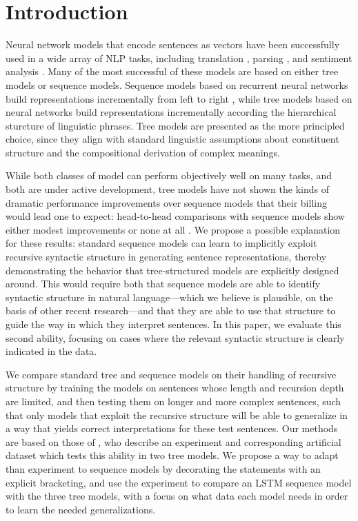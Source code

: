 \section{Introduction}\label{sec:intro}

Neural network models that encode sentences as vectors have been successfully used in a wide array of NLP tasks, including translation \cite{sutskever2014sequence}, parsing \cite{dyer2015transition}, and sentiment analysis \cite{tai2015improved}. Many of the most successful of these models are based on either tree models or sequence models. Sequence models based on recurrent neural networks build representations incrementally from left to right \cite{elman1990finding,sutskever2014sequence}, while tree models based on  neural networks \cite{goller1996learning,socher2011semi} build representations incrementally according the hierarchical sturcture of linguistic phrases. Tree models are presented as the more principled choice, since they align with standard linguistic assumptions about constituent structure and the compositional derivation of complex meanings.

While both classes of model can perform objectively well on many tasks, and both are under active development, tree models have not shown the kinds of dramatic performance improvements over sequence models that their billing would lead one to expect: head-to-head comparisons with sequence models show either modest improvements \cite{tai2015improved} or none at all \cite{li2015tree}. We propose a possible explanation for these results: standard sequence models can learn to implicitly exploit recursive syntactic structure in generating sentence representations, thereby demonstrating the behavior that tree-structured models are explicitly designed around. This would require both that sequence models are able to identify syntactic structure in natural language---which we believe is plausible, on the basis of other recent research---and that they are able to use that structure to guide the way in which they interpret sentences. In this paper, we  evaluate this second ability, focusing on cases where the relevant syntactic structure is clearly indicated in the data.

We compare standard tree and sequence models on their handling of recursive structure by training the models on sentences whose length and recursion depth are limited, and then testing them on longer and more complex sentences, such that only models that exploit the recursive structure will be able to generalize in a way that yields correct interpretations for these test sentences. Our methods are based on those of , who describe an experiment and corresponding artificial dataset which tests this ability in two tree models. We propose a way to adapt than experiment to sequence models by decorating the statements with an explicit bracketing, and use the experiment to compare an LSTM sequence model with the three tree models, with a focus on what data each model needs in order to learn the needed generalizations.

